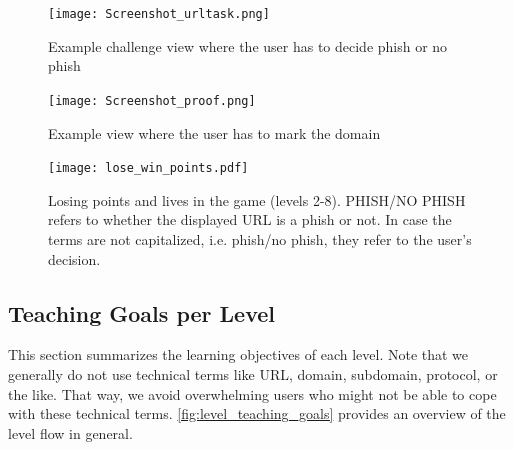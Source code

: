 \begin{figure}[hHtbp]
\centering
\texttt{[image: Screenshot\_urltask.png]}
\caption{Example challenge view where the user has to decide phish or no phish}
\label{fig:Screenshot_urltask}
\end{figure}


\begin{figure}[hHtbp]
\centering
\texttt{[image: Screenshot\_proof.png]}
\caption{Example view where the user has to mark the domain}
\label{fig:Screenshot_proof}
\end{figure}

\begin{figure}[hHtbp]
\centering
\texttt{[image: lose\_win\_points.pdf]}
\caption{Losing points and lives in the game (levels 2-8). PHISH/NO PHISH refers to whether the displayed URL is a phish or not. In case the terms are not capitalized, i.e. phish/no phish, they refer to the user's decision.}
\label{fig:lose_points_life}
\end{figure}

\subsection{Teaching Goals per Level}
\label{s:knowledgetransferperlevel}
This section summarizes the learning objectives of each level.
 Note that we generally do not use technical terms like URL, domain, subdomain, protocol, or the like. 
That way, we avoid overwhelming users who might not be able to cope with these technical terms.
\autoref{fig:level_teaching_goals} provides an overview of the level flow in general.


